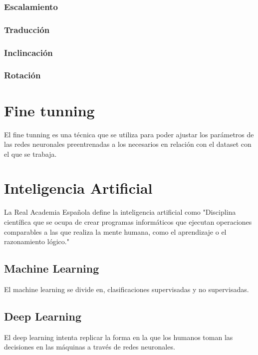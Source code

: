 \subsubsection{Escalamiento}

\subsubsection{Traducción}

\subsubsection{Inclincación}

\subsubsection{Rotación}

\section{Fine tunning}
El fine tunning es una técnica que se utiliza para poder ajustar los parámetros de las redes neuronales preentrenadas a los necesarios en relación con
el dataset con el que se trabaja.

\section{Inteligencia Artificial}

La Real Academia Española define la inteligencia artificial como "Disciplina científica que se ocupa de crear programas informáticos que ejecutan 
operaciones comparables a las que realiza la mente humana, como el aprendizaje o el razonamiento lógico."

\subsection{Machine Learning}

El machine learning se divide en, clasificaciones supervisadas y no supervisadas.

\subsection{Deep Learning}

El deep learning intenta replicar la forma en la que los humanos toman las decisiones en las máquinas a través de redes neuronales.



